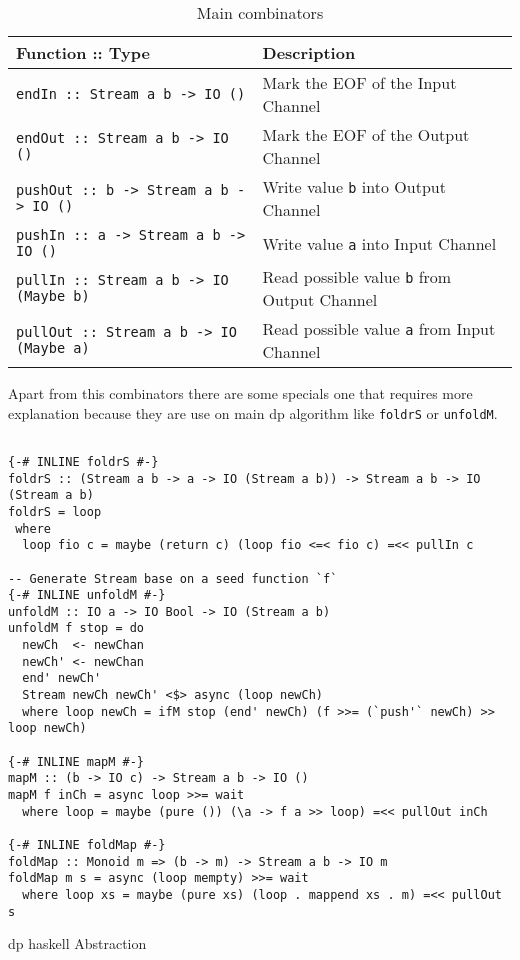 \documentclass[12pt]{article}
\begin{document}
\begin{table}[H]
  \begin{tabular}{|l|l|}
   \hline
   Function :: Type & Description\\
   \hline
   \texttt{endIn :: Stream a b -> IO ()} & Mark the EOF of the Input Channel \\
   \hline
   \texttt{endOut :: Stream a b -> IO ()} & Mark the EOF of the Output Channel \\
   \hline
   \texttt{pushOut :: b -> Stream a b -> IO ()} & Write value \texttt{b} into Output Channel \\
   \hline
   \texttt{pushIn :: a -> Stream a b -> IO ()} & Write value \texttt{a} into Input Channel \\
   \hline
   \texttt{pullIn :: Stream a b -> IO (Maybe b)} & Read possible value \texttt{b} from Output Channel \\
   \hline
   \texttt{pullOut :: Stream a b -> IO (Maybe a)} & Read possible value \texttt{a} from Input Channel \\
   \hline
  \end{tabular}
 \caption{Main combinators}
 \label{table:1}
 \end{table}
 
Apart from this combinators there are some specials one that requires more explanation because they are use on main \acrshort{dp} algorithm
like \texttt{foldrS} or \texttt{unfoldM}.

\begin{listing}[H]
\begin{verbatim}    

{-# INLINE foldrS #-}
foldrS :: (Stream a b -> a -> IO (Stream a b)) -> Stream a b -> IO (Stream a b)
foldrS = loop
 where
  loop fio c = maybe (return c) (loop fio <=< fio c) =<< pullIn c

-- Generate Stream base on a seed function `f`
{-# INLINE unfoldM #-}
unfoldM :: IO a -> IO Bool -> IO (Stream a b)
unfoldM f stop = do
  newCh  <- newChan
  newCh' <- newChan
  end' newCh'
  Stream newCh newCh' <$> async (loop newCh)
  where loop newCh = ifM stop (end' newCh) (f >>= (`push'` newCh) >> loop newCh)

{-# INLINE mapM #-}
mapM :: (b -> IO c) -> Stream a b -> IO ()
mapM f inCh = async loop >>= wait
  where loop = maybe (pure ()) (\a -> f a >> loop) =<< pullOut inCh

{-# INLINE foldMap #-}
foldMap :: Monoid m => (b -> m) -> Stream a b -> IO m
foldMap m s = async (loop mempty) >>= wait
  where loop xs = maybe (pure xs) (loop . mappend xs . m) =<< pullOut s

\end{verbatim}
\caption{\acrshort{dp} \acrshort{haskell} Abstraction}
\label{src:haskell:5}
\end{listing}
\end{document}
